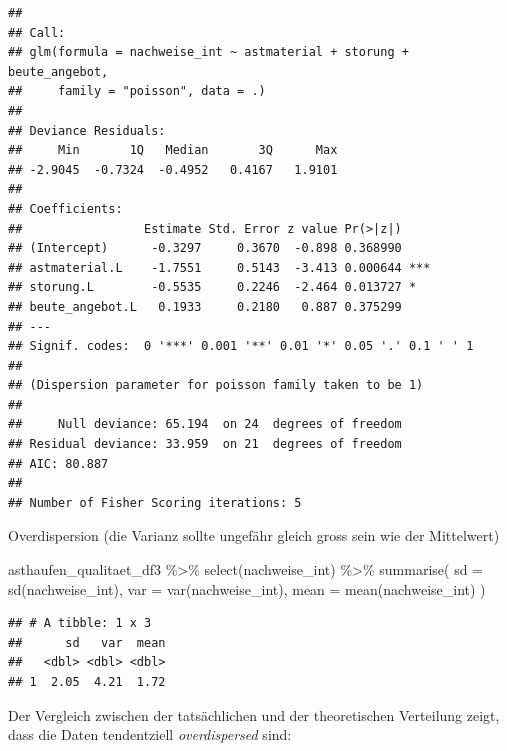 \documentclass[
  oneside]{scrbook}
\newenvironment{Shaded}{\begin{snugshade}}{\end{snugshade}}
\newcommand{\AttributeTok}[1]{\textcolor[rgb]{0.77,0.63,0.00}{#1}}
\newcommand{\FunctionTok}[1]{\textcolor[rgb]{0.00,0.00,0.00}{#1}}
\newcommand{\NormalTok}[1]{#1}
\newcommand{\SpecialCharTok}[1]{\textcolor[rgb]{0.00,0.00,0.00}{#1}}
\begin{document}
\begin{verbatim}
## 
## Call:
## glm(formula = nachweise_int ~ astmaterial + storung + beute_angebot, 
##     family = "poisson", data = .)
## 
## Deviance Residuals: 
##     Min       1Q   Median       3Q      Max  
## -2.9045  -0.7324  -0.4952   0.4167   1.9101  
## 
## Coefficients:
##                 Estimate Std. Error z value Pr(>|z|)    
## (Intercept)      -0.3297     0.3670  -0.898 0.368990    
## astmaterial.L    -1.7551     0.5143  -3.413 0.000644 ***
## storung.L        -0.5535     0.2246  -2.464 0.013727 *  
## beute_angebot.L   0.1933     0.2180   0.887 0.375299    
## ---
## Signif. codes:  0 '***' 0.001 '**' 0.01 '*' 0.05 '.' 0.1 ' ' 1
## 
## (Dispersion parameter for poisson family taken to be 1)
## 
##     Null deviance: 65.194  on 24  degrees of freedom
## Residual deviance: 33.959  on 21  degrees of freedom
## AIC: 80.887
## 
## Number of Fisher Scoring iterations: 5
\end{verbatim}

Overdispersion (die Varianz sollte ungefähr gleich gross sein wie der Mittelwert)

\begin{Shaded}
\begin{Highlighting}[]
\NormalTok{asthaufen\_qualitaet\_df3 }\SpecialCharTok{\%\textgreater{}\%} 
  \FunctionTok{select}\NormalTok{(nachweise\_int) }\SpecialCharTok{\%\textgreater{}\%} 
  \FunctionTok{summarise}\NormalTok{(}
    \AttributeTok{sd =} \FunctionTok{sd}\NormalTok{(nachweise\_int),}
    \AttributeTok{var =} \FunctionTok{var}\NormalTok{(nachweise\_int),}
    \AttributeTok{mean =} \FunctionTok{mean}\NormalTok{(nachweise\_int)}
\NormalTok{    )}
\end{Highlighting}
\end{Shaded}

\begin{verbatim}
## # A tibble: 1 x 3
##      sd   var  mean
##   <dbl> <dbl> <dbl>
## 1  2.05  4.21  1.72
\end{verbatim}

Der Vergleich zwischen der tatsächlichen und der theoretischen Verteilung zeigt, dass die Daten tendentziell \emph{overdispersed} sind:
\end{document}

